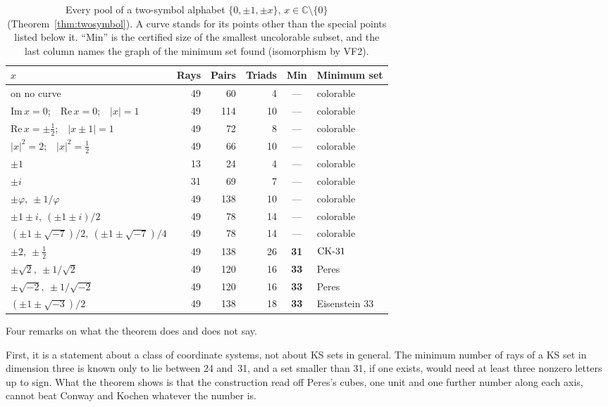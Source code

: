 \begin{table}[t]
\centering
\caption{Every pool of a two-symbol alphabet $\{0,\pm1,\pm x\}$, $x\in\mathbb{C}\setminus\{0\}$
(Theorem~\ref{thm:twosymbol}).  A curve stands for its points other than the special points
listed below it.  ``Min'' is the certified size of the smallest uncolorable subset, and the last
column names the graph of the minimum set found (isomorphism by VF2).}
\label{tab:twosymbol}
\small
\begin{tabular}{@{}lrrrcl@{}}
\toprule
$x$ & Rays & Pairs & Triads & Min & Minimum set \\
\midrule
on no curve & 49 & 60 & 4 & --- & colorable \\
$\mathrm{Im}\,x=0$;\ \ $\mathrm{Re}\,x=0$;\ \ $|x|=1$ & 49 & 114 & 10 & --- & colorable \\
$\mathrm{Re}\,x=\pm\tfrac12$;\ \ $|x\pm1|=1$ & 49 & 72 & 8 & --- & colorable \\
$|x|^2=2$;\ \ $|x|^2=\tfrac12$ & 49 & 66 & 10 & --- & colorable \\
\midrule
$\pm1$ & 13 & 24 & 4 & --- & colorable \\
$\pm i$ & 31 & 69 & 7 & --- & colorable \\
$\pm\varphi,\ \pm1/\varphi$ & 49 & 138 & 10 & --- & colorable \\
$\pm1\pm i,\ (\pm1\pm i)/2$ & 49 & 78 & 14 & --- & colorable \\
$(\pm1\pm\sqrt{-7})/2,\ (\pm1\pm\sqrt{-7})/4$ & 49 & 78 & 14 & --- & colorable \\
$\pm2,\ \pm\tfrac12$ & 49 & 138 & 26 & \textbf{31} & $\mathrm{CK}\text{-}31$ \\
$\pm\sqrt2,\ \pm1/\sqrt2$ & 49 & 120 & 16 & \textbf{33} & Peres \\
$\pm\sqrt{-2},\ \pm1/\sqrt{-2}$ & 49 & 120 & 16 & \textbf{33} & Peres \\
$(\pm1\pm\sqrt{-3})/2$ & 49 & 138 & 18 & \textbf{33} & Eisenstein 33 \\
\bottomrule
\end{tabular}
\end{table}

Four remarks on what the theorem does and does not say.

First, it is a statement about a class of coordinate systems, not about KS sets in general.
The minimum number of rays of a KS set in dimension three is known only to lie between 24
and~31, and a set smaller than 31, if one exists, would need at least three nonzero letters up to
sign.  What the theorem
shows is that the construction read off Peres's cubes, one unit and one further number along
each axis, cannot beat Conway and Kochen whatever the number is.

